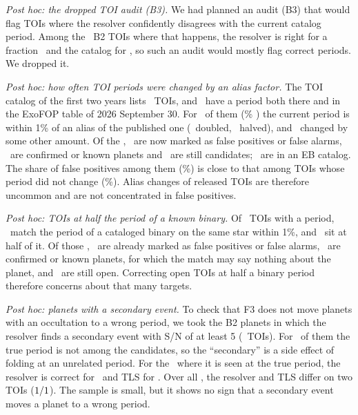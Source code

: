 \documentclass[twocolumn,linenumbers]{aastex701}
\begin{document}
\emph{Post hoc: the dropped TOI audit (B3).} We had planned an audit (B3) that would flag TOIs where the resolver confidently disagrees with the current catalog period. Among the \nogoN\ B2 TOIs where that happens, the resolver is right for a fraction \nogoRight\ and the catalog for \nogoCatRight, so such an audit would mostly flag correct periods. We dropped it.

\emph{Post hoc: how often TOI periods were changed by an alias factor.} The TOI catalog of the first two years \citep{Guerrero2021} lists \revHist\ TOIs, and \revBoth\ have a period both there and in the ExoFOP table of 2026 September 30. For \revAlias\ of them (\revAliasPc\% \revAliasCI) the current period is within 1\% of an alias of the published one (\revDouble\ doubled, \revHalf\ halved), and \revOther\ changed by some other amount. Of the \revAlias, \revAliasFp\ are now marked as false positives or false alarms, \revAliasCp\ are confirmed or known planets and \revAliasOpen\ are still candidates; \revAliasEb\ are in an EB catalog. The share of false positives among them (\revAliasFpPc\%) is close to that among TOIs whose period did not change (\revSameFpPc\%). Alias changes of released TOIs are therefore uncommon and are not concentrated in false positives.

\emph{Post hoc: TOIs at half the period of a known binary.} Of \bTwoHalfTotal\ TOIs with a period, \bTwoHalfSame\ match the period of a cataloged binary on the same star \citep{Prsa2022,Kostov2025} within 1\%, and \bTwoHalfN\ sit at half of it. Of those \bTwoHalfN, \bTwoHalfFp\ are already marked as false positives or false alarms, \bTwoHalfCp\ are confirmed or known planets, for which the match may say nothing about the planet, and \bTwoHalfOpen\ are still open. Correcting open TOIs at half a binary period therefore concerns about that many targets.

\emph{Post hoc: planets with a secondary event.} To check that F3 does not move planets with an occultation to a wrong period, we took the B2 planets in which the resolver finds a secondary event with S/N of at least 5 (\occN\ TOIs). For \occNoCand\ of them the true period is not among the candidates, so the ``secondary'' is a side effect of folding at an unrelated period. For the \occTrueN\ where it is seen at the true period, the resolver is correct for \occTrueRes\ and TLS for \occTrueTls. Over all \occN, the resolver and TLS differ on two TOIs ($1/1$). The sample is small, but it shows no sign that a secondary event moves a planet to a wrong period.
\end{document}
